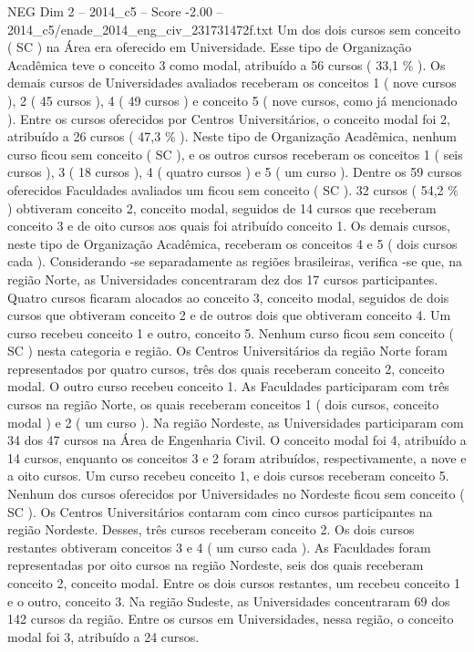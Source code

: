 \begin{textsample}{NEG Dim 2 – 2014\_c5 – Score -2.00 – 2014\_c5/enade\_2014\_eng\_civ\_231731472f.txt}
Um dos dois cursos sem conceito ( SC ) na Área era oferecido em Universidade.
Esse tipo de Organização Acadêmica teve o conceito 3 como modal, atribuído a 56 cursos ( 33,1 \% ).
Os demais cursos de Universidades avaliados receberam os conceitos 1 ( nove cursos ), 2 ( 45 cursos ), 4 ( 49 cursos ) e conceito 5 ( nove cursos, como já mencionado ).
Entre os cursos oferecidos por Centros Universitários, o conceito modal foi 2, atribuído a 26 cursos ( 47,3 \% ).
Neste tipo de Organização Acadêmica, nenhum curso ficou sem conceito ( SC ), e os outros cursos receberam os conceitos 1 ( seis cursos ), 3 ( 18 cursos ), 4 ( quatro cursos ) e 5 ( um curso ).
Dentre os 59 cursos oferecidos Faculdades avaliados um ficou sem conceito ( SC ). 32 cursos ( 54,2 \% ) obtiveram conceito 2, conceito modal, seguidos de 14 cursos que receberam conceito 3 e de oito cursos aos quais foi atribuído conceito 1.
Os demais cursos, neste tipo de Organização Acadêmica, receberam os conceitos 4 e 5 ( dois cursos cada ).
Considerando -se separadamente as regiões brasileiras, verifica -se que, na região Norte, as Universidades concentraram dez dos 17 cursos participantes.
Quatro cursos ficaram alocados ao conceito 3, conceito modal, seguidos de dois cursos que obtiveram conceito 2 e de outros dois que obtiveram conceito 4.
Um curso recebeu conceito 1 e outro, conceito 5.
Nenhum curso ficou sem conceito ( SC ) nesta categoria e região.
Os Centros Universitários da região Norte foram representados por quatro cursos, três dos quais receberam conceito 2, conceito modal.
O outro curso recebeu conceito 1.
As Faculdades participaram com três cursos na região Norte, os quais receberam conceitos 1 ( dois cursos, conceito modal ) e 2 ( um curso ).
Na região Nordeste, as Universidades participaram com 34 dos 47 cursos na Área de Engenharia Civil.
O conceito modal foi 4, atribuído a 14 cursos, enquanto os conceitos 3 e 2 foram atribuídos, respectivamente, a nove e a oito cursos.
Um curso recebeu conceito 1, e dois cursos receberam conceito 5.
Nenhum dos cursos oferecidos por Universidades no Nordeste ficou sem conceito ( SC ).
Os Centros Universitários contaram com cinco cursos participantes na região Nordeste.
Desses, três cursos receberam conceito 2.
Os dois cursos restantes obtiveram conceitos 3 e 4 ( um curso cada ).
As Faculdades foram representadas por oito cursos na região Nordeste, seis dos quais receberam conceito 2, conceito modal.
Entre os dois cursos restantes, um recebeu conceito 1 e o outro, conceito 3.
Na região Sudeste, as Universidades concentraram 69 dos 142 cursos da região.
Entre os cursos em Universidades, nessa região, o conceito modal foi 3, atribuído a 24 cursos.

\end{textsample}
